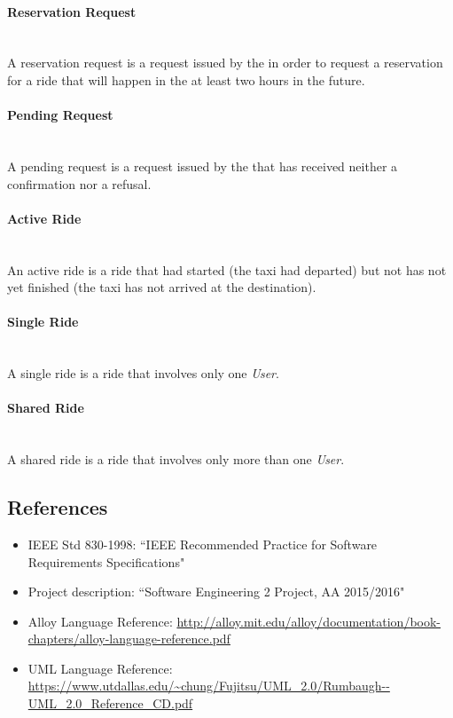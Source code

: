 \paragraph{Reservation Request} \hfill \\
\label{def:reservation-request} A reservation request is a request issued by the  in order to request a reservation for a ride that will happen in the at least two hours in the future.

\paragraph{Pending Request} \hfill \\
\label{def:pending-request} A pending request is a request issued by the  that has received neither a confirmation nor a refusal.

\paragraph{Active Ride} \hfill \\
\label{def:active-ride} An active ride is a ride that had started (the taxi had departed) but not has not yet finished (the taxi has not arrived at the destination).

\paragraph{Single Ride} \hfill \\
\label{def:single-ride} A single ride is a ride that involves only one \emph{User}.

\paragraph{Shared Ride} \hfill \\
\label{def:shared-ride} A shared ride is a ride that involves only more than one \emph{User}.


\subsection{References}
\begin{itemize}
\item IEEE Std 830-1998: ``IEEE Recommended Practice for Software Requirements Specifications"
\item Project description: ``Software Engineering 2 Project, AA 2015/2016"
\item Alloy Language Reference: \url{http://alloy.mit.edu/alloy/documentation/book-chapters/alloy-language-reference.pdf}
\item UML Language Reference: \url{https://www.utdallas.edu/~chung/Fujitsu/UML_2.0/Rumbaugh--UML_2.0_Reference_CD.pdf}
\end{itemize}

